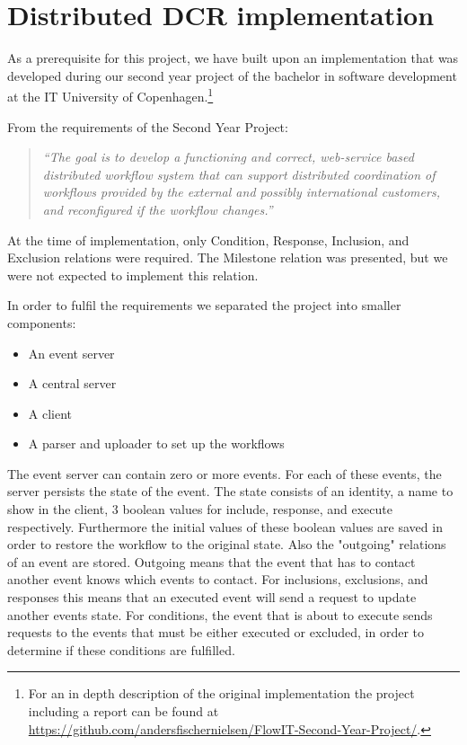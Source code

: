 	\section{Distributed DCR implementation}
		As a prerequisite for this project, we have built upon an implementation that was developed during our second year project of the bachelor in software development at the IT University of Copenhagen.\footnote{For an in depth description of the original implementation the project including a report can be found at \url{https://github.com/andersfischernielsen/FlowIT-Second-Year-Project/}.}
		
		\newpar From the requirements of the Second Year Project:
		
		\begin{quotation}
			\noindent\textit{``The goal is to develop a functioning and correct, web-service based distributed workflow system that can support distributed coordination of workflows provided by the external and possibly international customers, and reconfigured if the workflow changes.''}
		\end{quotation}
		
		\newpar At the time of implementation, only Condition, Response, Inclusion, and Exclusion relations were required. The Milestone relation was presented, but we were not expected to implement this relation. 
		
		\newpar In order to fulfil the requirements we separated the project into smaller components:
		
		\begin{itemize}
			\item An event server
			\item A central server
			\item A client
			\item A parser and uploader to set up the workflows
		\end{itemize}
		
		\newpar The event server can contain zero or more events. For each of these events, the server persists the state of the event. The state consists of an identity, a name to show in the client, 3 boolean values for include, response, and execute respectively. Furthermore the initial values of these boolean values are saved in order to restore the workflow to the original state. Also the "outgoing" relations of an event are stored. Outgoing means that the event that has to contact another event knows which events to contact. For inclusions, exclusions, and responses this means that an executed event will send a request to update another events state. For conditions, the event that is about to execute sends requests to the events that must be either executed or excluded, in order to determine if these conditions are fulfilled.
		
